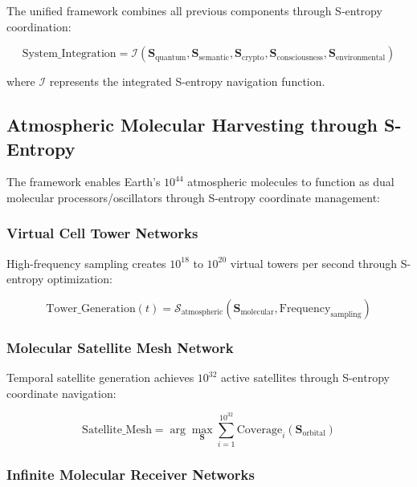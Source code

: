 \documentclass[12pt,a4paper]{article}
\begin{document}
{{{{{{{{{{{{{The unified framework combines all previous components through S-entropy coordination:

\begin{equation}
\text{System\_Integration} = \mathcal{I}(\mathbf{S}_{\text{quantum}}, \mathbf{S}_{\text{semantic}}, \mathbf{S}_{\text{crypto}}, \mathbf{S}_{\text{consciousness}}, \mathbf{S}_{\text{environmental}})
\end{equation}

where $\mathcal{I}$ represents the integrated S-entropy navigation function.

\subsection{Atmospheric Molecular Harvesting through S-Entropy}

The framework enables Earth's $10^{44}$ atmospheric molecules to function as dual molecular processors/oscillators through S-entropy coordinate management:

\subsubsection{Virtual Cell Tower Networks}

High-frequency sampling creates $10^{18}$ to $10^{20}$ virtual towers per second through S-entropy optimization:

\begin{equation}
\text{Tower\_Generation}(t) = \mathcal{S}_{\text{atmospheric}}(\mathbf{S}_{\text{molecular}}, \text{Frequency}_{\text{sampling}})
\end{equation}

\subsubsection{Molecular Satellite Mesh Network}

Temporal satellite generation achieves $10^{32}$ active satellites through S-entropy coordinate navigation:

\begin{equation}
\text{Satellite\_Mesh} = \arg\max_{\mathbf{S}} \sum_{i=1}^{10^{32}} \text{Coverage}_i(\mathbf{S}_{\text{orbital}})
\end{equation}

\subsubsection{Infinite Molecular Receiver Networks}

}}}}}}}}}}}}}
\end{document}
